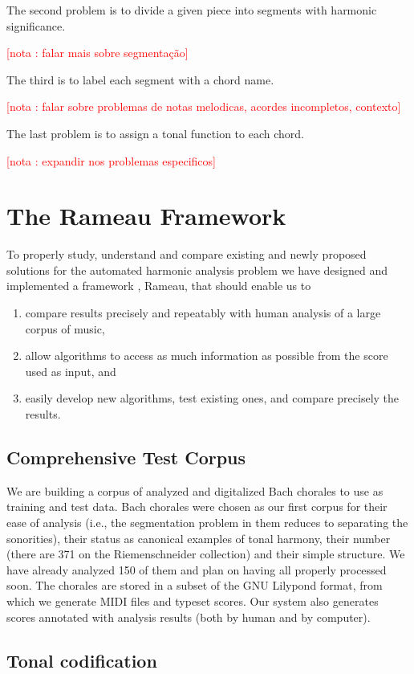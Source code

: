 \documentclass{article}
\newcounter{notacounter}
\newcommand{\nota}[1]{
  \addtocounter{notacounter}{1}
  \textcolor{red}{[nota \arabic{notacounter}: #1]}
}
\begin{document}
The second problem is to divide a given piece into segments with
harmonic significance. \nota{falar mais sobre segmentação}

The third is to label each segment with a chord name. \nota{falar
  sobre problemas de notas melodicas, acordes incompletos, contexto}

The last problem is to assign a tonal function to each chord.
\nota{expandir nos problemas especificos}

\section{The Rameau Framework}
\label{sec:system}

To properly study, understand and compare existing and newly proposed
solutions for the automated harmonic analysis problem we have designed
and implemented a framework , Rameau, that should enable us to

\begin{enumerate}
\item compare results precisely and repeatably with human analysis of
  a large corpus of music,
\item allow algorithms to access as much information as possible from
  the score used as input, and
\item easily develop new algorithms, test existing ones, and compare
  precisely the results.
\end{enumerate}

\subsection{Comprehensive Test Corpus}
\label{sec:comprehensive-test-corpus}

We are building a corpus of analyzed and digitalized Bach chorales to
use as training and test data. Bach chorales were chosen as our first
corpus for their ease of analysis (i.e., the segmentation problem in
them reduces to separating the sonorities), their status as canonical
examples of tonal harmony, their number (there are 371 on the
Riemenschneider collection) and their simple structure. We have
already analyzed 150 of them and plan on having all properly processed
soon. The chorales are stored in a subset of the GNU Lilypond
\cite{nienhuys:lilypond} format, from which we generate MIDI files and
typeset scores. Our system also generates scores annotated with
analysis results (both by human and by computer).

\subsection{Tonal codification}
\label{sec:codificacao-jamary}
\end{document}
